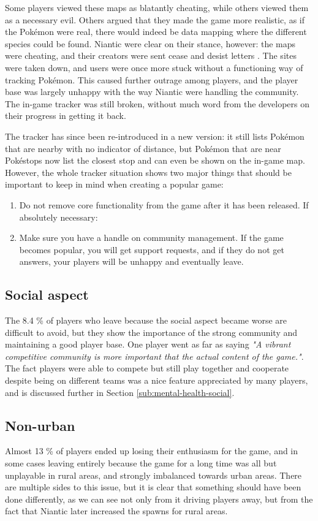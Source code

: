 Some players viewed these maps as blatantly cheating, while others viewed them as a necessary evil. Others argued that they made the game more realistic, as if the Pokémon were real, there would indeed be data mapping where the different species could be found. Niantic were clear on their stance, however: the maps were cheating, and their creators were sent cease and desist letters . The sites were taken down, and users were once more stuck without a functioning way of tracking Pokémon. This caused further outrage among players, and the player base was largely unhappy with the way Niantic were handling the community. The in-game tracker was still broken, without much word from the developers on their progress in getting it back.

The tracker has since been re-introduced in a new version: it still lists Pokémon that are nearby with no indicator of distance, but Pokémon that are near Pokéstops now list the closest stop and can even be shown on the in-game map. However, the whole tracker situation shows two major things that should be important to keep in mind when creating a popular game:

\begin{enumerate}
	\item Do not remove core functionality from the game after it has been released. If absolutely necessary:
	\item Make sure you have a handle on community management. If the game becomes popular, you will get support requests, and if they do not get answers, your players will be unhappy and eventually leave.
\end{enumerate}

\subsection{Social aspect}
The 8.4 \% of players who leave because the social aspect became worse are difficult to avoid, but they show the importance of the strong community and maintaining a good player base. One player went as far as saying \emph{"A vibrant competitive community is more important that the actual content of the game."}. The fact players were able to compete but still play together and cooperate despite being on different teams was a nice feature appreciated by many players, and is discussed further in Section \ref{sub:mental-health-social}.

\subsection{Non-urban}
\label{sec:the-rural-problem}
Almost 13 \% of players ended up losing their enthusiasm for the game, and in some cases leaving entirely because the game for a long time was all but unplayable in rural areas, and strongly imbalanced towards urban areas. There are multiple sides to this issue, but it is clear that something should have been done differently, as we can see not only from it driving players away, but from the fact that Niantic later increased the spawns for rural areas.


